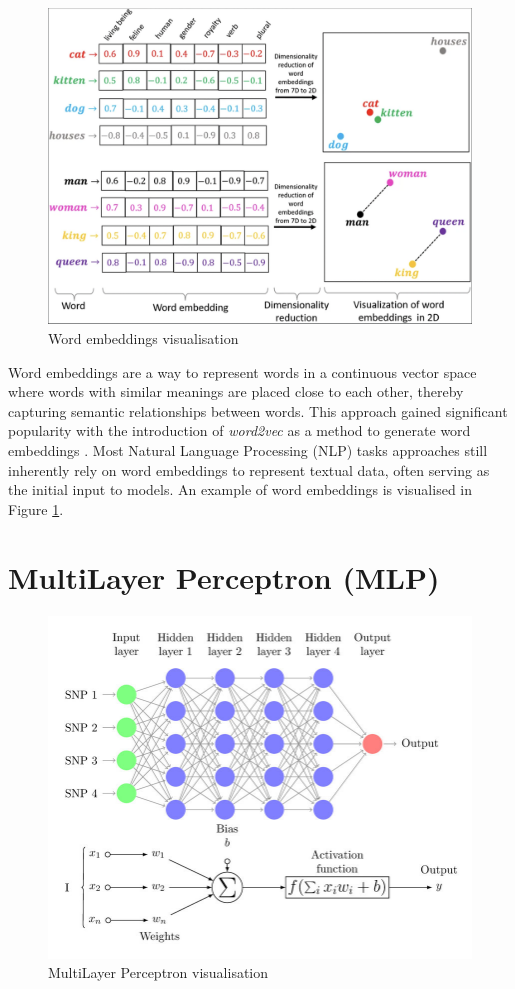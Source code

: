 \begin{figure}[htbp]
    \centering
    \includegraphics[width=0.9\linewidth]{images/word_embeddings.png}
    \caption{Word embeddings visualisation \cite{narayanan-2019-word-embeddings}}
    \label{fig:word-embeddings}
\end{figure}

Word embeddings are a way to represent words in a continuous vector space where words with similar meanings are placed close to each other, thereby capturing semantic relationships between words. This approach gained significant popularity with the introduction of \textit{word2vec} as a method to generate word embeddings \cite{mikolov-2013-embeddings}. Most Natural Language Processing (NLP) tasks approaches still inherently rely on word embeddings to represent textual data, often serving as the initial input to models. An example of word embeddings is visualised in Figure \ref{fig:word-embeddings}.


\section{MultiLayer Perceptron (MLP)}

\begin{figure}[htbp]
    \centering
    \includegraphics[width=0.9\linewidth]{images/mlp.png}
    \caption{MultiLayer Perceptron visualisation \cite{perez-enciso-2019-guide}}
    \label{fig:mlp}
\end{figure}

